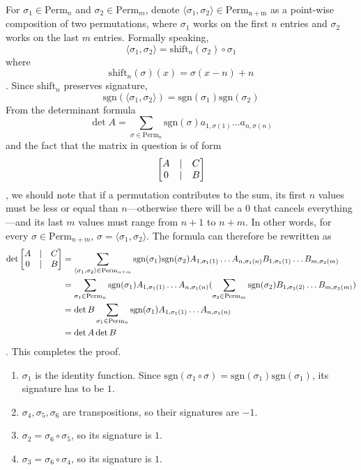 \documentclass{homework}
\begin{document}
\begin{problem}{5}
\newcommand \comPerm[2]{\langle#1,#2\rangle}
\newcommand \sgn{\mathrm{sgn}}
For $\sigma_1 \in \mathrm{Perm}_n$ and $\sigma_2 \in \mathrm{Perm}_m$,
denote $\comPerm{\sigma_1}{\sigma_2} \in \mathrm{Perm_{n+m}}$ as a point-wise
composition of two permutations, where $\sigma_1$ works on the first $n$ entries
and $\sigma_2$ works on the last $m$ entries. Formally speaking,
$$\comPerm{\sigma_1}{\sigma_2} = \mathrm{shift}_n(\sigma_2) \circ \sigma_1$$
where
$$\mathrm{shift}_n(\sigma)(x) = \sigma(x - n) + n$$
. Since $\mathrm{shift}_n$ preserves signature,
$$\sgn(\comPerm{\sigma_1}{\sigma_2}) = \sgn(\sigma_1)\sgn(\sigma_2)$$
From the determinant formula
$$\det A = \sum_{\sigma \in \mathrm{Perm}_{n}}
\sgn(\sigma)a_{1,\sigma(1)}\hdots a_{n,\sigma(n)}$$
and the fact that the matrix in question is of form
$$\begin{bmatrix}A&|&C\\0&|&B\end{bmatrix}$$
, we should note that if a permutation contributes to the sum, its first
$n$ values must be less or equal than $n$---otherwise there will be a $0$
that cancels everything---and its last $m$ values must range from $n + 1$
to $n + m$. In other words, for every $\sigma \in \mathrm{Perm}_{n+m}$,
$\sigma = \comPerm{\sigma_1}{\sigma_2}$. The formula can therefore be
rewritten as
\begin{align*}
\det \bmat{A&|&C\\0&|&B} &=
\sum_{\comPerm{\sigma_1}{\sigma_2} \in \mathrm{Perm}_{n+m}}
\sgn(\sigma_1)\sgn(\sigma_2)
A_{1,\sigma_1(1)}\hdots A_{n,\sigma_1(n)}
B_{1,\sigma_1(1)}\hdots B_{m,\sigma_2(m)} \\
&=
\sum_{\sigma_1 \in \mathrm{Perm}_n}
\sgn(\sigma_1)A_{1,\sigma_1(1)}\hdots A_{n,\sigma_1(n)}(
\sum_{\sigma_2 \in \mathrm{Perm}_m}
\sgn(\sigma_2)B_{1,\sigma_2(2)}\hdots B_{m,\sigma_2(m)}) \\
&= \det B \sum_{\sigma_1 \in \mathrm{Perm}_n}
\sgn(\sigma_1)A_{1,\sigma_1(1)}\hdots A_{n,\sigma_1(n)} \\
&= \det A \det B
\end{align*}
. This completes the proof. \QED
\end{problem}

\begin{problem}{6}
\newcommand \sgn{\mathrm{sgn}}
\begin{enumerate}
\item $\sigma_1$ is the identity function. Since
$\sgn(\sigma_1 \circ \sigma) = \sgn(\sigma_1)\sgn(\sigma_1)$, its signature
has to be $1$.

\item $\sigma_4, \sigma_5, \sigma_6$ are transpositions, so their signatures
are $-1$.

\item $\sigma_2 = \sigma_6 \circ \sigma_5$, so its signature is $1$.

\item $\sigma_3 = \sigma_6 \circ \sigma_4$, so its signature is $1$.
\end{enumerate}
\end{problem}
\end{document}
